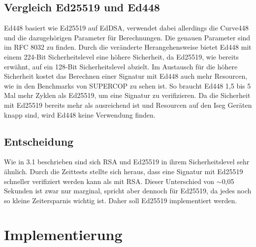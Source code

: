 \documentclass[thesis=bachelor,faculty=cb]{hsmw-thesis}
\begin{document}
\section{Vergleich Ed25519 und Ed448}
Ed448 basiert wie Ed25519 auf EdDSA, verwendet dabei allerdings die Curve448 und die dazugehörigen Parameter für Berechnungen. Die genauen Parameter sind im RFC 8032 \cite[Vgl. S.15-19]{ed25519} zu finden. Durch die veränderte Herangehensweise bietet Ed448 mit einem 224-Bit Sicherheitslevel \cite[Vgl. S.3]{ed25519} eine höhere Sicherheit, da Ed25519, wie bereits erwähnt, auf ein 128-Bit Sicherheitslevel abzielt. Im Austausch für die höhere Sicherheit kostet das Berechnen einer Signatur mit Ed448 auch mehr Resourcen, wie in den Benchmarks von SUPERCOP \cite{ed448} zu sehen ist. So braucht Ed448 1,5 bis 5 Mal mehr Zyklen als Ed25519, um eine Signatur zu verifizieren. Da die Sicherheit mit Ed25519 bereits mehr als ausreichend ist und Resourcen auf den Iseg Geräten knapp sind, wird Ed448 keine Verwendung finden.
\section{Entscheidung}
Wie in 3.1 beschrieben sind sich RSA und Ed25519 in ihrem Sicherheitslevel sehr ähnlich. Durch die Zeittests stellte sich heraus, dass eine Signatur mit Ed25519 schneller verifiziert werden kann als mit RSA.
Dieser Unterschied von $\sim$0,05 Sekunden ist zwar nur marginal, spricht aber dennoch für Ed25519, da jedes noch so kleine Zeitersparnis wichtig ist. Daher soll Ed25519 implementiert werden.  
\chapter{Implementierung}
\end{document}
